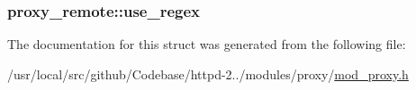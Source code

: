 \subsubsection[{\texorpdfstring{use\+\_\+regex}{use_regex}}]{ proxy\+\_\+remote\+::use\+\_\+regex}\hypertarget{structproxy__remote_a9c7d2244047ad71e288cb5cc0d3b12db}{}\label{structproxy__remote_a9c7d2244047ad71e288cb5cc0d3b12db}


The documentation for this struct was generated from the following file\+:\begin{DoxyCompactItemize}
\item 
/usr/local/src/github/\+Codebase/httpd-\/2../modules/proxy/\hyperlink{mod__proxy_8h}{mod\+\_\+proxy.\+h}\end{DoxyCompactItemize}
